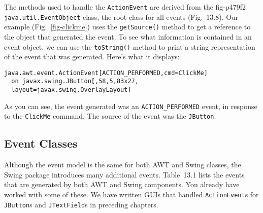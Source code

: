 \pagebreak
The methods used to handle the {\tt ActionEvent} are derived from the
{fig-p479f2}
{\tt java.util.EventObject} class, the root class for all events
(Fig.~13.8).  Our example (Fig.~\ref{fig-clickme}) uses
the {\tt getSource()} method to get a reference to the object that
generated the event.  To see what information is contained in an
event object, we can use the {\tt toString()} method to print
a string representation of the event that was generated.  Here's what
it displays:

\begin{jjjlisting}
\begin{lstlisting}
java.awt.event.ActionEvent[ACTION_PERFORMED,cmd=ClickMe]
  on javax.swing.JButton[,58,5,83x27,
  layout=javax.swing.OverlayLayout]
\end{lstlisting}
\end{jjjlisting}

\noindent As you can see, the event generated was an {\tt ACTION\_PERFORMED}
event, in response to the {\tt ClickMe} command.  The source of the event
was the {\tt JButton}.

\subsection{Event Classes}

\noindent Although the event model is the same for both AWT and Swing
classes, the Swing package introduces many additional events.
Table~13.1 lists the events that are generated by both AWT and Swing
components.  You already have worked with some of these. We have
written GUIs that handled {\tt ActionEvent}s for {\tt JButton}s and
{\tt JTextField}s in preceding chapters.

